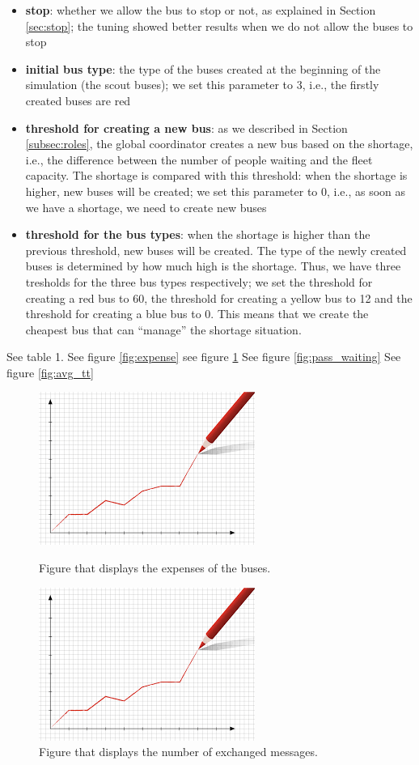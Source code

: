\documentclass[a4paper]{article}
\begin{document}
\begin{itemize}
\item \textbf{stop}: whether we allow the bus to stop or not, as explained in Section \ref{sec:stop}; the tuning showed better results when we do not allow the buses to stop
\item \textbf{initial bus type}: the type of the buses created at the beginning of the simulation (the scout buses); we set this parameter to 3, i.e., the firstly created buses are red
\item \textbf{threshold for creating a new bus}: as we described in Section \ref{subsec:roles}, the global coordinator creates a new bus based on the shortage, i.e., the difference between the number of people waiting and the fleet capacity. The shortage is compared with this threshold: when the shortage is higher, new buses will be created; we set this parameter to 0, i.e., as soon as we have a shortage, we need to create new buses
\item \textbf{threshold for the bus types}: when the shortage is higher than the previous threshold, new buses will be created. The type of the newly created buses is determined by how much high is the shortage. Thus, we have three tresholds for the three bus types respectively; we set the threshold for creating a red bus to 60, the threshold for creating a yellow bus to 12 and the threshold for creating a blue bus to 0. This means that we create the cheapest bus that can ``manage'' the shortage situation. 
\end{itemize}

See table 1.
See figure \ref{fig:expense}
see figure \ref{fig:messages}
See figure \ref{fig:pass_waiting}
See figure \ref{fig:avg_tt}

\begin{figure}
\centering
\begin{minipage}{.5\textwidth}
  \includegraphics[width=.4\textwidth]{expenses.jpg}
  \caption{\label{fig:expense}Figure that displays the expenses of the buses.}
\end{minipage}%
\begin{minipage}{.5\textwidth}
  \includegraphics[width=.4\textwidth]{nr_messages.jpg}
  \caption{\label{fig:messages}Figure that displays the number of exchanged messages.}
\end{minipage}
\end{figure}
\end{document}
